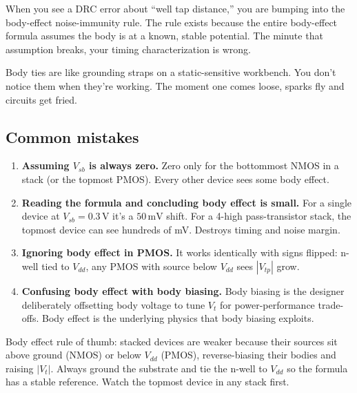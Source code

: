 \documentclass[11pt]{article}
\begin{document}
\begin{pdnote}
When you see a DRC error about ``well tap distance,'' you are bumping into the body-effect noise-immunity rule. The rule exists because the entire body-effect formula assumes the body is at a known, stable potential. The minute that assumption breaks, your timing characterization is wrong.
\end{pdnote}

\begin{hook}
Body ties are like grounding straps on a static-sensitive workbench. You don't notice them when they're working. The moment one comes loose, sparks fly and circuits get fried.
\end{hook}

\subsection{Common mistakes}

\begin{enumerate}
\item \textbf{Assuming $V_{sb}$ is always zero.} Zero only for the bottommost NMOS in a stack (or the topmost PMOS). Every other device sees some body effect.
\item \textbf{Reading the formula and concluding body effect is small.} For a single device at $V_{sb} = 0.3\,\text{V}$ it's a $50\,\text{mV}$ shift. For a 4-high pass-transistor stack, the topmost device can see hundreds of mV. Destroys timing and noise margin.
\item \textbf{Ignoring body effect in PMOS.} It works identically with signs flipped: n-well tied to $V_{dd}$, any PMOS with source below $V_{dd}$ sees $|V_{tp}|$ grow.
\item \textbf{Confusing body effect with body biasing.} Body biasing is the designer deliberately offsetting body voltage to tune $V_t$ for power-performance trade-offs. Body effect is the underlying physics that body biasing exploits.
\end{enumerate}

\begin{checkpoint}
Body effect rule of thumb: stacked devices are weaker because their sources sit above ground (NMOS) or below $V_{dd}$ (PMOS), reverse-biasing their bodies and raising $|V_t|$. Always ground the substrate and tie the n-well to $V_{dd}$ so the formula has a stable reference. Watch the topmost device in any stack first.
\end{checkpoint}
\end{document}
